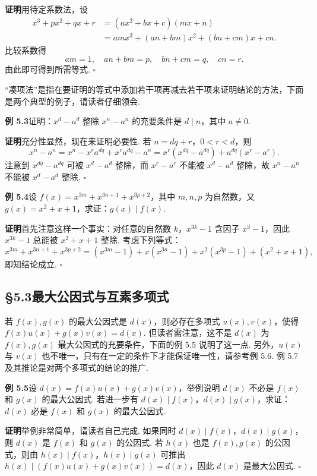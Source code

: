 \documentclass[UTF8,12pt,a4paper,fontset=fandol]{ctexart}
\begin{document}
\noindent\textbf{证明}\quad 用待定系数法，设
\[
\begin{aligned}
x^3+px^2+qx+r
&=(ax^2+bx+c)(mx+n)\\
&=amx^3+(an+bm)x^2+(bn+cm)x+cn.
\end{aligned}
\]
比较系数得
\[
am=1,\quad an+bm=p,\quad bn+cm=q,\quad cn=r.
\]
由此即可得到所需等式. \hfill $\square$

``凑项法''是指在要证明的等式中添加若干项再减去若干项来证明结论的方法，下面是两个典型的例子，请读者仔细领会.

\noindent\textbf{例 5.3}\quad 证明：$x^d-a^d$ 整除 $x^n-a^n$ 的充要条件是 $d\mid n$，其中 $a\ne0$.

\noindent\textbf{证明}\quad 充分性显然，现在来证明必要性. 若 $n=dq+r$，$0<r<d$，则
\[
x^n-a^n=x^n-x^ra^{dq}+x^ra^{dq}-a^n
=x^r(x^{dq}-a^{dq})+a^{dq}(x^r-a^r).
\]
注意到 $x^{dq}-a^{dq}$ 可被 $x^d-a^d$ 整除，而 $x^r-a^r$ 不能被 $x^d-a^d$ 整除，故 $x^n-a^n$ 不能被 $x^d-a^d$ 整除. \hfill $\square$

\noindent\textbf{例 5.4}\quad 设 $f(x)=x^{3m}+x^{3n+1}+x^{3p+2}$，其中 $m,n,p$ 为自然数，又 $g(x)=x^2+x+1$，求证：$g(x)\mid f(x)$.

\noindent\textbf{证明}\quad 首先注意这样一个事实：对任意的自然数 $k$，$x^{3k}-1$ 含因子 $x^3-1$，因此 $x^{3k}-1$ 总能被 $x^2+x+1$ 整除. 考虑下列等式：
\[
x^{3m}+x^{3n+1}+x^{3p+2}
=(x^{3m}-1)+x(x^{3n}-1)+x^2(x^{3p}-1)+(x^2+x+1),
\]
即知结论成立. \hfill $\square$

\subsection*{§5.3\quad 最大公因式与互素多项式}

若 $f(x),g(x)$ 的最大公因式是 $d(x)$，则必存在多项式 $u(x),v(x)$，使得 $f(x)u(x)+g(x)v(x)=d(x)$. 但读者需注意，这不是 $d(x)$ 为 $f(x),g(x)$ 最大公因式的充要条件，下面的例 5.5 说明了这一点. 另外，$u(x)$ 与 $v(x)$ 也不唯一，只有在一定的条件下才能保证唯一性，请参考例 5.6. 例 5.7 及其推论是对两个多项式的结论的推广.

\noindent\textbf{例 5.5}\quad 设 $d(x)=f(x)u(x)+g(x)v(x)$，举例说明 $d(x)$ 不必是 $f(x)$ 和 $g(x)$ 的最大公因式. 若进一步有 $d(x)\mid f(x)$，$d(x)\mid g(x)$，求证：$d(x)$ 必是 $f(x)$ 和 $g(x)$ 的最大公因式.

\noindent\textbf{证明}\quad 举例非常简单，请读者自己完成. 如果同时 $d(x)\mid f(x)$，$d(x)\mid g(x)$，则 $d(x)$ 是 $f(x)$ 和 $g(x)$ 的公因式. 若 $h(x)$ 也是 $f(x),g(x)$ 的公因式，则由 $h(x)\mid f(x)$，$h(x)\mid g(x)$ 可推出 $h(x)\mid (f(x)u(x)+g(x)v(x))=d(x)$，因此 $d(x)$ 是最大公因式. \hfill $\square$
\end{document}
